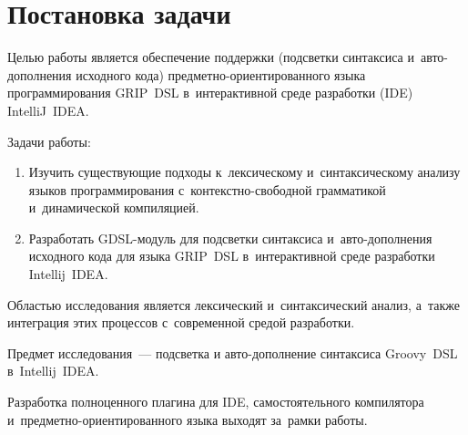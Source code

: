 \section{Постановка задачи} \label{sub21}

Целью работы является обеспечение поддержки (подсветки синтаксиса и~авто-дополнения исходного кода) предметно-ориентированного языка программирования GRIP~DSL в~интерактивной среде разработки (IDE) IntelliJ~IDEA.

Задачи работы: 

\begin{enumerate} 
\item{Изучить существующие подходы к~лексическому и~синтаксическому анализу языков программирования с~контекстно-свободной грамматикой и~динамической компиляцией.}	
\item{Разработать GDSL-модуль для подсветки синтаксиса и~авто-дополнения исходного кода для языка GRIP~DSL в~интерактивной среде разработки Intellij~IDEA.}
\end{enumerate} 

Областью исследования является лексический и~синтаксический анализ, а~также интеграция этих процессов с~современной средой разработки.

Предмет исследования~--- подсветка и авто-дополнение синтаксиса Groovy~DSL в~Intellij~IDEA.

Разработка полноценного плагина для IDE, самостоятельного компилятора и~предметно-ориентированного языка выходят за~рамки работы.
